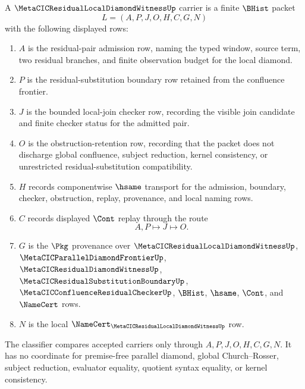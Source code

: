 \begin{definition}
\label{def:metacic-residual-local-diamond-witness-carrier}
A $\MetaCICResidualLocalDiamondWitnessUp$ carrier is a finite $\BHist$ packet
$$
L=(A,P,J,O,H,C,G,N)
$$
with the following displayed rows:
\begin{enumerate}
\item $A$ is the residual-pair admission row, naming the typed window, source term, two residual branches, and finite observation budget for the local diamond.
\item $P$ is the residual-substitution boundary row retained from the confluence frontier.
\item $J$ is the bounded local-join checker row, recording the visible join candidate and finite checker status for the admitted pair.
\item $O$ is the obstruction-retention row, recording that the packet does not discharge global confluence, subject reduction, kernel consistency, or unrestricted residual-substitution compatibility.
\item $H$ records componentwise $\hsame$ transport for the admission, boundary, checker, obstruction, replay, provenance, and local naming rows.
\item $C$ records displayed $\Cont$ replay through the route
$$
A,P \longmapsto J \longmapsto O .
$$
\item $G$ is the $\Pkg$ provenance over $\MetaCICResidualLocalDiamondWitnessUp$, $\MetaCICParallelDiamondFrontierUp$, $\MetaCICResidualDiamondWitnessUp$, $\MetaCICResidualSubstitutionBoundaryUp$, $\MetaCICConfluenceResidualCheckerUp$, $\BHist$, $\hsame$, $\Cont$, and $\NameCert$ rows.
\item $N$ is the local $\NameCert_{\MetaCICResidualLocalDiamondWitnessUp}$ row.
\end{enumerate}
The classifier compares accepted carriers only through $A,P,J,O,H,C,G,N$. It has no coordinate for premise-free parallel diamond, global Church--Rosser, subject reduction, evaluator equality, quotient syntax equality, or kernel consistency.
\end{definition}

